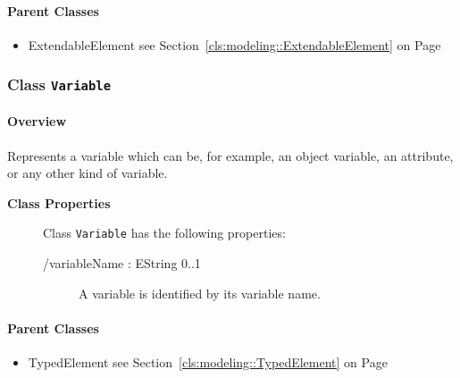 	



\paragraph{Parent Classes}
\begin{itemize}
\item ExtendableElement see Section~\ref{cls:modeling::ExtendableElement} on Page~\pageref{cls:modeling::ExtendableElement}\end{itemize}
\subsubsection{\Large{Class \bfseries \texttt{Variable}\normalfont}}
\label{cls:modeling::Variable} 
\paragraph{Overview}

	
			
Represents a variable which can be, for example, an object variable, an attribute, or any other kind of variable.	
		
	


\begin{description}

	\item[\textbf{Class Properties}] Class \texttt{Variable} has the following properties:
	\begin{description}
\item[/variableName : EString 			0..1]

\hspace{\fill}
\nopagebreak


	
			
A variable is identified by its variable name.	
		
	
	\end{description}
	
	

\end{description}

\paragraph{Parent Classes}
\begin{itemize}
\item TypedElement see Section~\ref{cls:modeling::TypedElement} on Page~\pageref{cls:modeling::TypedElement}\end{itemize}
\newpage
		


